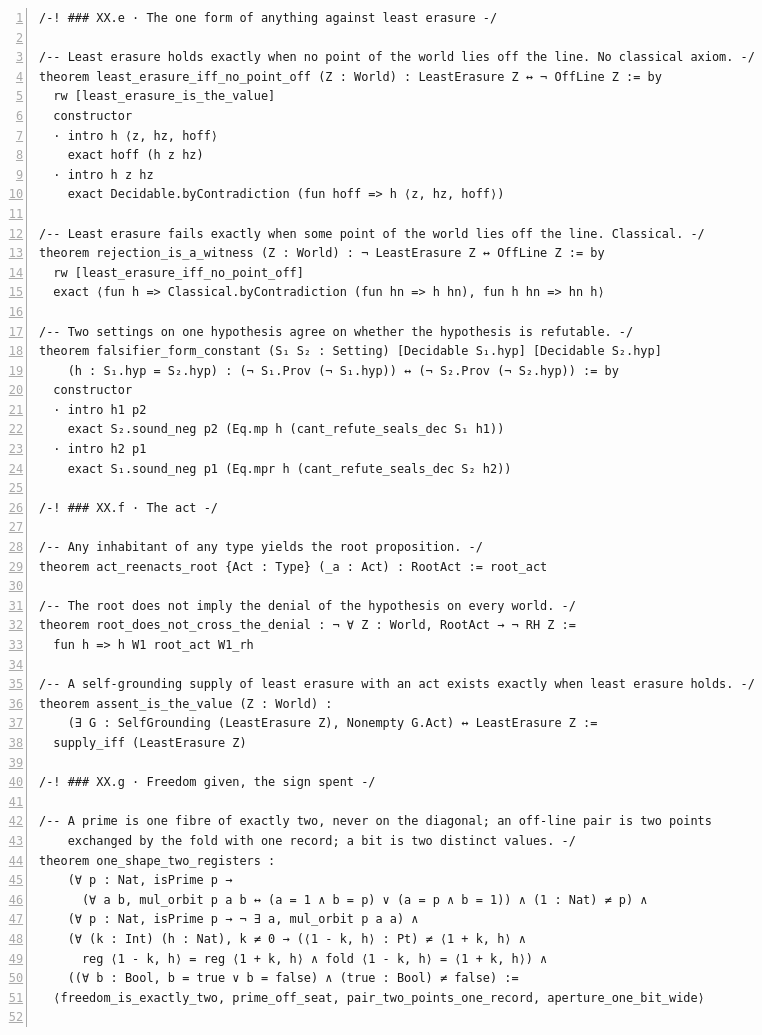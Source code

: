 \documentclass[10pt]{article}
\newcommand{\leansize}{\fontsize{5.5pt}{6.75pt}\selectfont}
\begin{document}
\begin{multicols}{2}
\begin{Verbatim}[numbers=left,firstnumber=1,numbersep=3pt,xleftmargin=2.6em,breaklines=true,breakanywhere=true,breakautoindent=false,breakindent=1.4em,breaksymbolleft={},breakanywheresymbolpre={},fontsize=\leansize]
/-! ### XX.e · The one form of anything against least erasure -/

/-- Least erasure holds exactly when no point of the world lies off the line. No classical axiom. -/
theorem least_erasure_iff_no_point_off (Z : World) : LeastErasure Z ↔ ¬ OffLine Z := by
  rw [least_erasure_is_the_value]
  constructor
  · intro h ⟨z, hz, hoff⟩
    exact hoff (h z hz)
  · intro h z hz
    exact Decidable.byContradiction (fun hoff => h ⟨z, hz, hoff⟩)

/-- Least erasure fails exactly when some point of the world lies off the line. Classical. -/
theorem rejection_is_a_witness (Z : World) : ¬ LeastErasure Z ↔ OffLine Z := by
  rw [least_erasure_iff_no_point_off]
  exact ⟨fun h => Classical.byContradiction (fun hn => h hn), fun h hn => hn h⟩

/-- Two settings on one hypothesis agree on whether the hypothesis is refutable. -/
theorem falsifier_form_constant (S₁ S₂ : Setting) [Decidable S₁.hyp] [Decidable S₂.hyp]
    (h : S₁.hyp = S₂.hyp) : (¬ S₁.Prov (¬ S₁.hyp)) ↔ (¬ S₂.Prov (¬ S₂.hyp)) := by
  constructor
  · intro h1 p2
    exact S₂.sound_neg p2 (Eq.mp h (cant_refute_seals_dec S₁ h1))
  · intro h2 p1
    exact S₁.sound_neg p1 (Eq.mpr h (cant_refute_seals_dec S₂ h2))

/-! ### XX.f · The act -/

/-- Any inhabitant of any type yields the root proposition. -/
theorem act_reenacts_root {Act : Type} (_a : Act) : RootAct := root_act

/-- The root does not imply the denial of the hypothesis on every world. -/
theorem root_does_not_cross_the_denial : ¬ ∀ Z : World, RootAct → ¬ RH Z :=
  fun h => h W1 root_act W1_rh

/-- A self-grounding supply of least erasure with an act exists exactly when least erasure holds. -/
theorem assent_is_the_value (Z : World) :
    (∃ G : SelfGrounding (LeastErasure Z), Nonempty G.Act) ↔ LeastErasure Z :=
  supply_iff (LeastErasure Z)

/-! ### XX.g · Freedom given, the sign spent -/

/-- A prime is one fibre of exactly two, never on the diagonal; an off-line pair is two points
    exchanged by the fold with one record; a bit is two distinct values. -/
theorem one_shape_two_registers :
    (∀ p : Nat, isPrime p →
      (∀ a b, mul_orbit p a b ↔ (a = 1 ∧ b = p) ∨ (a = p ∧ b = 1)) ∧ (1 : Nat) ≠ p) ∧
    (∀ p : Nat, isPrime p → ¬ ∃ a, mul_orbit p a a) ∧
    (∀ (k : Int) (h : Nat), k ≠ 0 → (⟨1 - k, h⟩ : Pt) ≠ ⟨1 + k, h⟩ ∧
      reg ⟨1 - k, h⟩ = reg ⟨1 + k, h⟩ ∧ fold ⟨1 - k, h⟩ = ⟨1 + k, h⟩) ∧
    ((∀ b : Bool, b = true ∨ b = false) ∧ (true : Bool) ≠ false) :=
  ⟨freedom_is_exactly_two, prime_off_seat, pair_two_points_one_record, aperture_one_bit_wide⟩


\end{Verbatim}
\end{multicols}
\end{document}
